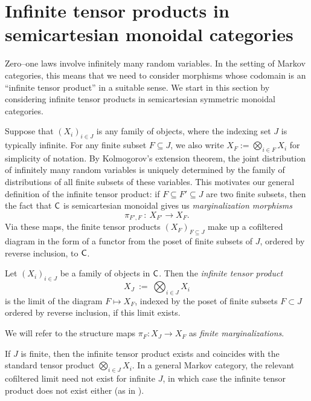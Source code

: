 \documentclass[11pt]{article}
\begin{document}
\section{Infinite tensor products in semicartesian monoidal categories}
\label{infprod_semicartesian}

Zero--one laws involve infinitely many random variables. In the setting of Markov categories, this means that we need to consider morphisms whose codomain is an ``infinite tensor product'' in a suitable sense. We start in this section by considering infinite tensor products in semicartesian symmetric monoidal categories.

Suppose that $(X_i)_{i \in J}$ is any family of objects, where the indexing set $J$ is typically infinite. For any finite subset $F \subseteq J$, we also write $X_F := \bigotimes_{i \in F} X_i$ for simplicity of notation. By Kolmogorov's extension theorem, the joint distribution of infinitely many random variables is uniquely determined by the family of distributions of all finite subsets of these variables. This motivates our general definition of the infinite tensor product: if $F \subseteq F' \subseteq J$ are two finite subsets, then the fact that $\mathsf{C}$ is semicartesian monoidal gives us \emph{marginalization morphisms}
\[
	\pi_{F',F} \: : \: X_{F'} \longrightarrow X_F.
\]
Via these maps, the finite tensor products $(X_F)_{F \subseteq J}$ make up a cofiltered diagram in the form of a functor from the poset of finite subsets of $J$, ordered by reverse inclusion, to $\mathsf{C}$.

\begin{definition}
	\label{semicartesian_infproduct}
	Let $(X_i)_{i \in J}$ be a family of objects in $\mathsf{C}$. Then the \emph{infinite tensor product}
	\[
		X_J \: := \: \bigotimes_{i \in J} X_i
	\]
	is the limit of the diagram $F \mapsto X_F$, indexed by the poset of finite subsets $F \subset J$ ordered by reverse inclusion, if this limit exists.
\end{definition}

We will refer to the structure maps $\pi_F : X_J \to X_F$ as \emph{finite marginalizations}. %

\begin{remark}
	If $J$ is finite, then the infinite tensor product exists and coincides with the standard tensor product $\bigotimes_{i \in J} X_i$. In a general Markov category, the relevant cofiltered limit need not exist for infinite $J$, in which case the infinite tensor product does not exist either (as in ).
\end{remark}
\end{document}
